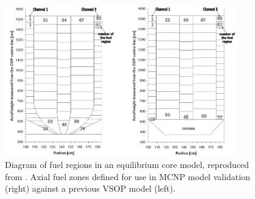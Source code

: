 \begin{figure}[H]
\centering
\includegraphics[width = 0.9\textwidth]{figures/bench-fuel-regions.png}
\caption{Diagram of fuel regions in an equilibrium core model, reproduced from \cite{albornoz_mcnp_nodate}.  Axial fuel zones defined for use in MCNP model validation (right) against a previous VSOP model (left).}
\label{fig:fuel-regions}
\end{figure}